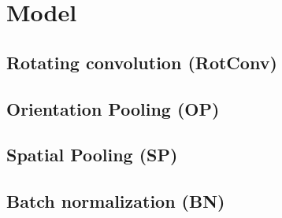\section{Model}
    \label{sec:model}
    
    \subsection{Rotating convolution (RotConv)}
    
    \subsection{Orientation Pooling (OP)}
    
    \subsection{Spatial Pooling (SP)}
    
    \subsection{Batch normalization (BN)}